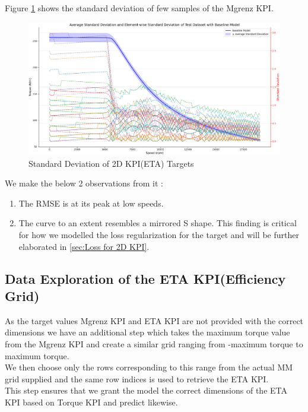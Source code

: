 \documentclass{report} %
\begin{document}
Figure \ref{fig:Standard Deviation of 2D KPI(ETA) Targets} shows the standard deviation of few samples of the Mgrenz \ac{KPI}.\\

\begin{figure}[H]
    \centering
    \includegraphics[width=1\textwidth]{./ReportImages/stddev_y1.png} 
    \caption{Standard Deviation of 2D KPI(ETA) Targets} 
    \label{fig:Standard Deviation of 2D KPI(ETA) Targets}
\end{figure}

We make the below 2 observations from it :
\begin{enumerate}
    \item The \ac{RMSE} is at its peak at low speeds.
    \item The curve to an extent resembles a mirrored S shape.
    This finding is critical for how we modelled the loss regularization for the target and will be further elaborated in \ref{sec:Loss for 2D KPI}.
\end{enumerate}


\subsection{Data Exploration of the ETA \ac{KPI}(Efficiency Grid)}\label{sec:Deep Dive into 3D KPI}

As the target values Mgrenz \ac{KPI} and ETA \ac{KPI} are not provided with the correct dimensions we have an additional step which takes the maximum torque value from the Mgrenz \ac{KPI} and create a similar grid ranging from -maximum torque to maximum torque. \\
We then choose only the rows corresponding to this range from the actual MM grid supplied and the same row indices is used to retrieve the ETA \ac{KPI}. \\
This step ensures that we grant the model the correct dimensions of the ETA \ac{KPI} based on Torque \ac{KPI} and predict likewise.\\
\end{document}
